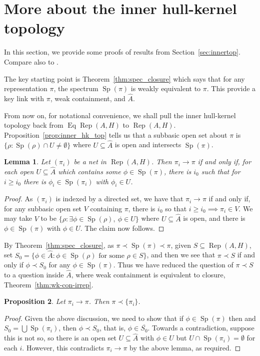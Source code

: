 \documentclass[a4paper,11pt]{article}
\newcommand{\Rep}{\operatorname{Rep}}
\newcommand{\Eq}{\operatorname{Eq}}
\newcommand{\Sp}{\operatorname{Sp}}
\newtheorem{lemma}{Lemma}[section]
\newtheorem{proposition}[lemma]{Proposition}
\begin{document}
\section{More about the inner hull-kernel topology}\label{app:iht_proofs}

In this section, we provide some proofs of results from Section~\ref{sec:innertop}.
Compare also to \cite{bhv, kan}.

The key starting point is Theorem~\ref{thm:spec_closure} which says that for any
representation $\pi$, the spectrum $\Sp(\pi)$ is weakly equivalent to $\pi$.
This provide a key link with $\pi$, weak containment, and $\hat A$.

From now on, for notational convenience, we shall pull the inner hull-kernel
topology back from $\Eq\Rep(A,H)$ to $\Rep(A,H)$.
Proposition~\ref{prop:inner_hk_top} tells us that a subbasic open set about
$\pi$ is $\{\rho : \Sp(\rho)\cap U \not=\emptyset \}$ where $U\subseteq\hat A$
is open and intersects $\Sp(\pi)$.

\begin{lemma}
Let $(\pi_i)$ be a net in $\Rep(A,H)$.  Then $\pi_i\rightarrow\pi$ if and only
if, for each open $U\subseteq\hat A$ which contains some $\phi\in\Sp(\pi)$,
there is $i_0$ such that for $i\geq i_0$ there is $\phi_i\in\Sp(\pi_i)$ with
$\phi_i\in U$.
\end{lemma}
\begin{proof}
As $(\pi_i)$ is indexed by a directed set, we have that $\pi_i\rightarrow\pi$
if and only if, for any subbasic open set $V$ containing $\pi$, there is $i_0$
so that $i\geq i_0\implies \pi_i\in V$.  We may take $V$ to be $\{\rho:
\exists \phi\in\Sp(\rho), \ \phi\in U \}$ where $U\subseteq\hat A$ is open, and
there is $\phi\in\Sp(\pi)$ with $\phi\in U$.  The claim now follows.
\end{proof}

By Theorem~\ref{thm:spec_closure}, as $\pi \prec \Sp(\pi) \prec \pi$, given
$S\subseteq\Rep(A,H)$, set $S_0 = \{ \phi\in\hat A : \phi\in\Sp(\rho)
\text{ for some } \rho\in S \}$, and then we see that $\pi\prec S$ if and only
if $\phi\prec S_0$ for any $\phi\in\Sp(\pi)$.  Thus we have reduced the question
of $\pi\prec S$ to a question inside $\hat A$, where weak containment is
equivalent to closure, Theorem~\ref{thm:wk-con-irrep}.

\begin{proposition}
Let $\pi_i\rightarrow\pi$.  Then $\pi\prec \{\pi_i\}$.
\end{proposition}
\begin{proof}
Given the above discussion, we need to show that if $\phi\in\Sp(\pi)$ then
and $S_0 = \bigcup \Sp(\pi_i)$, then $\phi\prec S_0$, that is, $\phi \in
\overline{S_0}$.  Towards a contradiction, suppose this is not so, so there
is an open set $U\subseteq\hat A$ with $\phi\in U$ but
$U\cap\Sp(\pi_i)=\emptyset$ for each $i$.  However, this contradicts
$\pi_i\rightarrow\pi$ by the above lemma, as required.
\end{proof}
\end{document}
